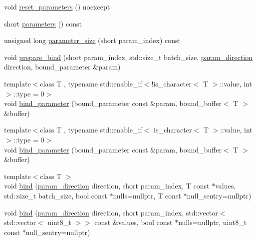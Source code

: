 \begin{DoxyCompactItemize}
void \mbox{\hyperlink{classnanodbc_1_1statement_1_1statement__impl_a64eaf2b2dc3531a1f00253ba5606366f}{reset\+\_\+parameters}} () noexcept
\item 
short \mbox{\hyperlink{classnanodbc_1_1statement_1_1statement__impl_a98a450f97e5bedb6b43151c199ff07ca}{parameters}} () const
\item 
unsigned long \mbox{\hyperlink{classnanodbc_1_1statement_1_1statement__impl_ada0f706dbba2ab234ba2d3bff416e6fd}{parameter\+\_\+size}} (short param\+\_\+index) const
\item 
void \mbox{\hyperlink{classnanodbc_1_1statement_1_1statement__impl_a25e6e41813daf5bf2c19add2b5acbf9b}{prepare\+\_\+bind}} (short param\+\_\+index, std\+::size\+\_\+t batch\+\_\+size, \mbox{\hyperlink{classnanodbc_1_1statement_a523142f53cbbee8d68a074da993e7fa6}{param\+\_\+direction}} direction, bound\+\_\+parameter \&param)
\item 
{\footnotesize template$<$class T , typename std\+::enable\+\_\+if$<$!is\+\_\+character$<$ T $>$\+::value, int $>$\+::type  = 0$>$ }\\void \mbox{\hyperlink{classnanodbc_1_1statement_1_1statement__impl_a8d3802d770a7e45ad53433728e9daa34}{bind\+\_\+parameter}} (bound\+\_\+parameter const \&param, bound\+\_\+buffer$<$ T $>$ \&buffer)
\item 
{\footnotesize template$<$class T , typename std\+::enable\+\_\+if$<$ is\+\_\+character$<$ T $>$\+::value, int $>$\+::type  = 0$>$ }\\void \mbox{\hyperlink{classnanodbc_1_1statement_1_1statement__impl_a8d3802d770a7e45ad53433728e9daa34}{bind\+\_\+parameter}} (bound\+\_\+parameter const \&param, bound\+\_\+buffer$<$ T $>$ \&buffer)
\item 
{\footnotesize template$<$class T $>$ }\\void \mbox{\hyperlink{classnanodbc_1_1statement_1_1statement__impl_aae37e90a862ea033c7717b015bf37ffd}{bind}} (\mbox{\hyperlink{classnanodbc_1_1statement_a523142f53cbbee8d68a074da993e7fa6}{param\+\_\+direction}} direction, short param\+\_\+index, T const $\ast$values, std\+::size\+\_\+t batch\+\_\+size, bool const $\ast$nulls=nullptr, T const $\ast$null\+\_\+sentry=nullptr)
\item 
void \mbox{\hyperlink{classnanodbc_1_1statement_1_1statement__impl_a9055bdd2f018c9e1458459d43b84404e}{bind}} (\mbox{\hyperlink{classnanodbc_1_1statement_a523142f53cbbee8d68a074da993e7fa6}{param\+\_\+direction}} direction, short param\+\_\+index, std\+::vector$<$ std\+::vector$<$ uint8\+\_\+t $>$$>$ const \&values, bool const $\ast$nulls=nullptr, uint8\+\_\+t const $\ast$null\+\_\+sentry=nullptr)
$$
\end{DoxyCompactItemize}
